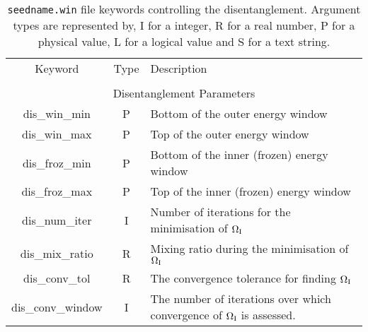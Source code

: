 \begin{table}
\begin{center}
\begin{tabular}{|c|c|p{6cm}|}
\hline
Keyword & Type & Description \\
        &      &             \\
\hline\hline
\multicolumn{3}{|c|}{Disentanglement Parameters} \\
\hline
{\sc dis\_win\_min }   & P & Bottom of the outer energy window \\
{\sc dis\_win\_max }   & P & Top of the outer energy window \\
{\sc dis\_froz\_min }   & P & Bottom of the inner (frozen) energy window \\
{\sc dis\_froz\_max }   & P & Top of the inner (frozen) energy window \\
{\sc dis\_num\_iter }   & I & Number of iterations for the minimisation
of $\Omega_{\mathrm{I}}$ \\
{\sc dis\_mix\_ratio }   & R & Mixing ratio during the minimisation of $\Omega_{\mathrm{I}}$\\
{\sc dis\_conv\_tol }   & R & The convergence tolerance for finding $\Omega_{\mathrm{I}}$ \\
{\sc dis\_conv\_window }   & I & The number of iterations over which
convergence of $\Omega_{\mathrm{I}}$ is assessed. \\ 
\hline
\end{tabular}
\caption[Parameter file keywords controlling disentanglement parameters.]
{{\tt seedname.win} file keywords controlling the disentanglement.
  Argument types 
are represented by, I for a integer, R for a real number, P for a
physical value, L for a logical value and S for a text string.}
\label{parameter_keywords4}
\end{center}
\end{table}




